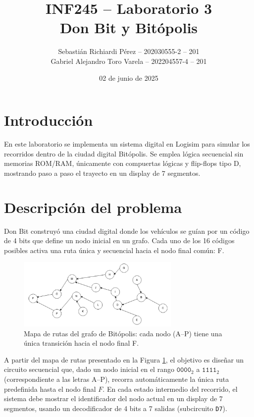 \documentclass[12pt]{article}
\title{\textbf{INF245 – Laboratorio 3} \\ Don Bit y Bitópolis}
\author{
    Sebastián Richiardi Pérez – 202030555-2 – 201\\
    Gabriel Alejandro Toro Varela – 202204557-4 – 201
}
\date{02 de junio de 2025}
\begin{document}
\maketitle

\newpage
\tableofcontents

\bigskip
\bigskip
\bigskip

\newpage

\section{Introducción}
En este laboratorio se implementa un sistema digital en Logisim para simular los recorridos dentro de la ciudad digital Bitópolis. Se emplea lógica secuencial sin memorias ROM/RAM, únicamente con compuertas lógicas y flip-flops tipo D, mostrando paso a paso el trayecto en un display de 7 segmentos.

\section{Descripción del problema}
Don Bit construyó una ciudad digital donde los vehículos se guían por un código de 4 bits que define un nodo inicial en un grafo. Cada uno de los 16 códigos posibles activa una ruta única y secuencial hacia el nodo final común: F.

\begin{figure}[H]
  \centering
  \includegraphics[width=0.7\textwidth]{.github/mapaderutas.png}
  \caption{Mapa de rutas del grafo de Bitópolis: cada nodo (A–P) tiene una única transición hacia el nodo final F.}
  \label{fig:mapaderutas}
\end{figure}

A partir del mapa de rutas presentado en la Figura \ref{fig:mapaderutas}, el objetivo es diseñar un circuito secuencial que, dado un nodo inicial en el rango \(\texttt{0000}_{2}\) a \(\texttt{1111}_{2}\) (correspondiente a las letras A–P), recorra automáticamente la única ruta predefinida hasta el nodo final \(F\). En cada estado intermedio del recorrido, el sistema debe mostrar el identificador del nodo actual en un display de 7 segmentos, usando un decodificador de 4 bits a 7 salidas (subcircuito \texttt{D7}).
\end{document}
